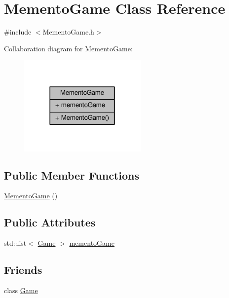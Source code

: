 \hypertarget{class_memento_game}{}\section{Memento\+Game Class Reference}
\label{class_memento_game}


{\ttfamily \#include $<$Memento\+Game.\+h$>$}



Collaboration diagram for Memento\+Game\+:
\nopagebreak
\begin{figure}[H]
\begin{center}
\leavevmode
\includegraphics[width=178pt]{class_memento_game__coll__graph}
\end{center}
\end{figure}
\subsection*{Public Member Functions}
\begin{DoxyCompactItemize}
\item 
\hyperlink{class_memento_game_a2993ec1d28cf09c727935f0a274998b7}{Memento\+Game} ()
\end{DoxyCompactItemize}
\subsection*{Public Attributes}
\begin{DoxyCompactItemize}
\item 
std\+::list$<$ \hyperlink{class_game}{Game} $>$ \hyperlink{class_memento_game_ab6e7ce49855575ec2b963c452cc5ddc2}{memento\+Game}
\end{DoxyCompactItemize}
\subsection*{Friends}
\begin{DoxyCompactItemize}
\item 
class \hyperlink{class_memento_game_aa2fab026580d6f14280c2ffb8063a314}{Game}
\end{DoxyCompactItemize}


